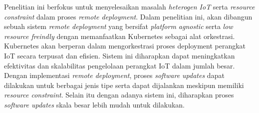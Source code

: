 Penelitian ini berfokus untuk menyelesaikan masalah \textit{heterogen IoT} serta \textit{resource constraint} dalam proses \textit{remote deployment}. Dalam penelitian ini, akan dibangun sebuah sistem \textit{remote deployment} yang bersifat \textit{platform agnostic} serta \textit{low resource freindly} dengan memanfaatkan Kubernetes sebagai alat orkestrasi. Kubernetes akan berperan dalam mengorkestrasi proses deployment perangkat IoT secara terpusat dan efisien. Sistem ini diharapkan dapat meningkatkan efektivitas dan skalabilitas pengelolaan perangkat IoT dalam jumlah besar. Dengan implementasi \textit{remote deployment}, proses \textit{software updates} dapat dilakukan untuk berbagai jenis tipe serta dapat dijalankan meskipun memiliki \textit{resource constraint}. Selain itu dengan adanya sistem ini, diharapkan proses \textit{software updates} skala besar lebih mudah untuk dilakukan.